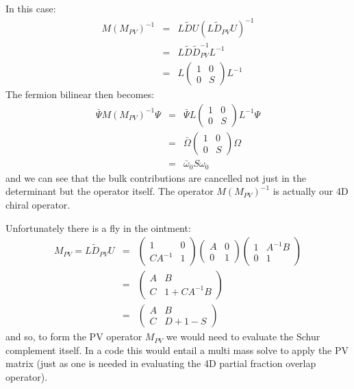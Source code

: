 \documentclass[12pt]{article}
\begin{document}
In this case:
\begin{eqnarray}
M ( M_{PV} )^{-1} &=& L \tilde{D} U \left( L \tilde{D}_{PV} U \right)^{-1} \\
&=& L \tilde{D} \tilde{D}_{PV}^{-1} L^{-1} \\
&=& L \left( \begin{array}{cc} 
 1 & 0 \\
 0 & S 
\end{array} \right) L^{-1}
\end{eqnarray}
The fermion bilinear then becomes:
\begin{eqnarray}
\bar{\Psi} M ( M_{PV} )^{-1} \Psi &=& \bar{\Psi} L \left( \begin{array}{cc} 
 1 & 0 \\
 0 & S 
\end{array} \right) L^{-1} \Psi \\
&=& \bar{\Omega} \left( \begin{array}{cc} 
 1 & 0 \\
 0 & S 
\end{array} \right) \Omega \\
&=& \bar{\omega}_0 S \omega_0 
\end{eqnarray}
 and we can see that the bulk contributions are cancelled not just in 
the determinant but the operator itself. The operator $M\left(M_{PV}\right)^{-1}$ is actually our 4D chiral operator.

Unfortunately there is a fly in the ointment:
\begin{eqnarray}
M_{PV} = L \tilde{D}_{PV} U &=&
\left( \begin{array}{cc}
1 & 0 \\
CA^{-1} & 1
\end{array} \right)
\left( \begin{array}{cc}
A & 0 \\
0 & 1 
\end{array} \right)
\left( \begin{array}{cc}
 1 & A^{-1} B \\
 0 & 1
\end{array} \right) \\
&=& \left( \begin{array}{cc} 
A & B \\
C & 1 + CA^{-1}B
\end{array}\right) \\
&=& \left( \begin{array}{cc} 
A & B \\
C & D+1-S
\end{array}\right)
\end{eqnarray}
and so, to form the PV operator $M_{PV}$ we would need to evaluate 
the Schur complement itself. In a code this would entail a multi mass solve
to apply the PV matrix (just as one is needed in evaluating the 4D partial 
fraction overlap operator).
\end{document}
